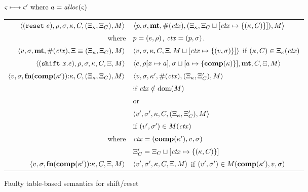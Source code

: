 \begin{figure}
  \centering
  $\varsigma \longmapsto \varsigma' \text{ where } a = \mathit{alloc}(\varsigma)$ \\
  \begin{tabular}{r|l}
    \hline
    $\langle (\texttt{reset}\ e), \rho, \sigma, \kappa, C, (\Xi_\kappa,\Xi_C), M \rangle$
    &
    $\langle p, \sigma, \mathbf{mt}, \#(\mathit{ctx}), (\Xi_\kappa,\Xi_C\sqcup[\mathit{ctx} \mapsto \{ (\kappa,C) \}]), M \rangle$
    \\
    where & $p = (e, \rho)$, $\mathit{ctx} = (p, \sigma)$.
    \\
    $\langle v, \sigma, \mathbf{mt}, \#(\mathit{ctx}), \Xi\equiv(\Xi_\kappa,\Xi_C), M \rangle$
    &
    $\langle v, \sigma, {\kappa}, {C}, \Xi, M\sqcup[\mathit{ctx} \mapsto \{ (v,\sigma) \}] \rangle$
    if $(\kappa,C) \in \Xi_\kappa(\mathit{ctx})$
    \\
    $\langle (\texttt{shift}\ x. e), \rho, \sigma, \kappa, C, \Xi, M \rangle$
    &
    $\langle e, \rho[x \mapsto a], \sigma\sqcup[a \mapsto \{ \mathbf{comp}(\kappa) \}],\mathbf{mt},C,\Xi,M \rangle$
    \\
    $\langle v,\sigma,\mathbf{fn}{}(\mathbf{comp}(\kappa')){\tt :} \kappa, C, (\Xi_\kappa,\Xi_C), M \rangle$
    &
    $\langle v, \sigma, \kappa', \#(\mathit{ctx}), (\Xi_\kappa,\Xi_C'),M \rangle$
    \\ & \quad if $\mathit{ctx} \notin \text{dom}(M)$
    \\
    & or \\
    & $\langle v', \sigma', \kappa, C, (\Xi_\kappa,\Xi_C'),M \rangle$
    \\ & \quad if $(v',\sigma') \in M(\mathit{ctx})$
    \\
    where & $\mathit{ctx} = (\mathbf{comp}(\kappa'), v, \sigma)$ \\
          & $\Xi_C' = \Xi_C\sqcup[\mathit{ctx} \mapsto \{ (\kappa,C) \}]$
    \\
    $\langle v,\sigma,\mathbf{fn}{}(\mathbf{comp}(\kappa')){\tt :} \kappa, C, \Xi, M \rangle$
    &
    $\langle v', \sigma', \kappa, C, \Xi,M \rangle$ if $(v',\sigma') \in M(\mathbf{comp}(\kappa'),v,\sigma)$
  \end{tabular}  
  \caption{Faulty table-based semantics for shift/reset}
  \label{fig:shift-reset-table0}
\end{figure}

